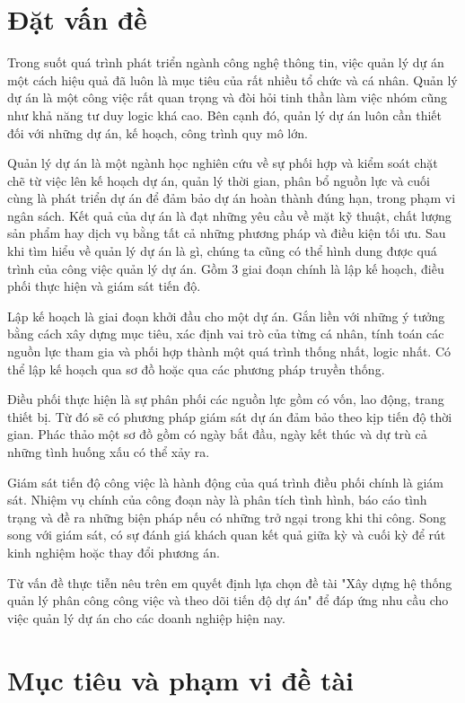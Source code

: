 \documentclass[../DoAn.tex]{subfiles}
\begin{document}
\section{Đặt vấn đề}
\label{section:1.1}

Trong suốt quá trình phát triển ngành công nghệ thông tin, việc quản lý dự án một cách hiệu quả đã luôn là mục tiêu của rất nhiều tổ chức và cá nhân.
Quản lý dự án là một công việc rất quan trọng và đòi hỏi tinh thần làm việc nhóm cũng như khả năng tư duy logic khá cao. Bên cạnh đó, quản lý dự án luôn cần thiết đối với những dự án, kế hoạch, công trình quy mô lớn.

Quản lý dự án là một ngành học nghiên cứu về sự phối hợp và kiểm soát chặt chẽ từ việc lên kế hoạch dự án, quản lý thời gian, phân bổ nguồn lực và cuối cùng là phát triển dự án để đảm bảo dự án hoàn thành đúng hạn,
trong phạm vi ngân sách. Kết quả của dự án là đạt những yêu cầu về mặt kỹ thuật, chất lượng sản phẩm hay dịch vụ bằng tất cả những phương pháp và điều kiện tối ưu. Sau khi tìm hiểu về quản lý dự án là gì,
chúng ta cũng có thể hình dung được quá trình của công việc quản lý dự án. Gồm 3 giai đoạn chính là lập kế hoạch, điều phối thực hiện và giám sát tiến độ.

Lập kế hoạch là giai đoạn khởi đầu cho một dự án. Gắn liền với những ý tưởng bằng cách xây dựng mục tiêu, xác định vai trò của từng cá nhân, tính toán các nguồn lực tham gia và phối hợp thành một quá trình thống nhất, logic nhất.
Có thể lập kế hoạch qua sơ đồ hoặc qua các phương pháp truyền thống.

Điều phối thực hiện là sự phân phối các nguồn lực gồm có vốn, lao động, trang thiết bị. Từ đó sẽ có phương pháp giám sát dự án đảm bảo theo kịp tiến độ thời gian.
Phác thảo một sơ đồ gồm có ngày bắt đầu, ngày kết thúc và dự trù cả những tình huống xấu có thể xảy ra.

Giám sát tiến độ công việc là hành động của quá trình điều phối chính là giám sát. Nhiệm vụ chính của công đoạn này là phân tích tình hình, báo cáo tình trạng
và đề ra những biện pháp nếu có những trở ngại trong khi thi công. Song song với giám sát, có sự đánh giá khách quan kết quả giữa kỳ và cuối kỳ để rút kinh nghiệm hoặc thay đổi phương án.

Từ vấn đề thực tiễn nêu trên em quyết định lựa chọn đề tài "Xây dựng hệ thống quản lý phân công công việc và theo dõi tiến độ dự án" để đáp ứng nhu cầu cho việc quản lý dự án cho các doanh nghiệp hiện nay.

\newpage

\section{Mục tiêu và phạm vi đề tài}
\label{section:1.2}
\end{document}
